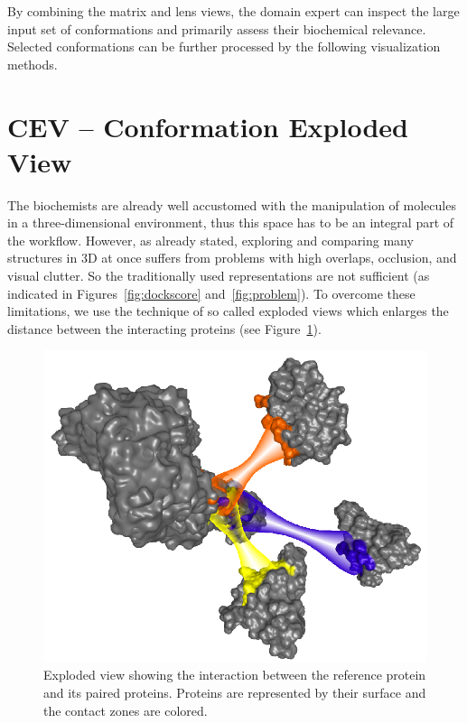 \documentclass[journal]{vgtc}                %
\begin{document}
By combining the matrix and lens views, the domain expert can inspect the large input set of conformations and primarily assess their biochemical relevance.
Selected conformations can be further processed by the following visualization methods.

\section{CEV -- Conformation Exploded View}
The biochemists are already well accustomed with the manipulation of molecules in a three-dimensional environment, thus this space has to be an integral part of the workflow.
However, as already stated, exploring and comparing many structures in 3D at once suffers from problems with high overlaps, occlusion, and visual clutter. 
So the traditionally used representations are not sufficient (as indicated in Figures~\ref{fig:dockscore} and~\ref{fig:problem}).
To overcome these limitations, we use the technique of so called exploded views which enlarges the distance between the interacting proteins (see Figure~\ref{fig:exploded}). 

\begin{figure}[bt]
  \centering
  \includegraphics[width=1.0\columnwidth]{exploded.png}
  \caption{Exploded view showing the interaction between the reference protein and its paired proteins. Proteins are represented by their surface and the contact zones are colored.}
  \label{fig:exploded}
\end{figure}
\end{document}
